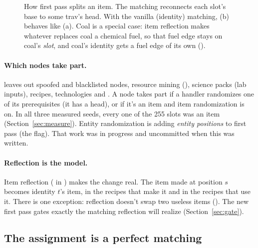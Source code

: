 \begin{figure}[tbp]
\caption{How first pass splits an item. The matching reconnects each slot's base to some trav's head. With the vanilla (identity) matching, (b) behaves like (a). Coal is a special case: item reflection makes whatever replaces coal a chemical fuel, so that fuel edge stays on coal's \emph{slot}, and coal's identity gets a fuel edge of its own ().}
\label{fig:split}
\end{figure}

\paragraph{Which nodes take part.}  leaves out spoofed and blacklisted nodes, resource mining (), science packs (lab inputs), recipes, technologies and . A node takes part if a handler randomizes one of its prerequisites (it has a head), or if it's an item and item randomization is on. In all three measured seeds, every one of the 255 slots was an item (Section~\ref{sec:measure}). Entity randomization is adding \emph{entity positions} to first pass (the  flag). That work was in progress and uncommitted when this was written.

\paragraph{Reflection is the model.} Item reflection ( in ) makes the change real. The item made at position $s$ becomes identity $t$'s item, in the recipes that make it and in the recipes that use it. There is one exception: reflection doesn't swap two useless items (). The new first pass gates exactly the matching reflection will realize (Section~\ref{sec:gate}).

\subsection{The assignment is a perfect matching}


